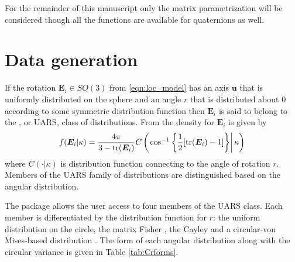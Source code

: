 For the remainder of this manuscript only the matrix parametrization will be considered though all the functions are available for quaternions as well.

\section{Data generation\label{section:generation}} 

If the rotation $\bm{E}_i\in SO(3)$ from \eqref{eqn:loc_model} has an axis $\bm u$ that is uniformly distributed on the sphere and an angle $r$ that is distributed about $0$ according to some symmetric distribution function then $\bm E_i$ is said to belong to the , or UARS, class of distributions.   From \cite{bingham2009} the density for $\bm E_i$ is given by
\begin{equation}\label{eq:uarsden}
f(\bm E_i|\kappa)=\frac{4\pi}{3-\text{tr}(\bm E_i)}C\left(\left.\cos^{-1}\left\{\frac{1}{2}[\text{tr}(\bm E_i)-1]\right\}\right|\kappa\right)
\end{equation}
where $C(\cdot|\kappa)$ is distribution function connecting to the angle of rotation $r$.  Members of the UARS family of distributions are distinguished based on the angular distribution.


The  package allows the user access to four members of the UARS class.  Each member is differentiated by the distribution function for $r$: the uniform distribution on the circle, the matrix Fisher \citep{langevin2005, downs1972, khatri1977, jupp1979}, the Cayley  \citep{Schaeben1997, leon2006} and a circular-von Mises-based distribution \citep{bingham2009}.   The form of each angular distribution along with the circular variance is given in Table \ref{tab:Crforms}.

